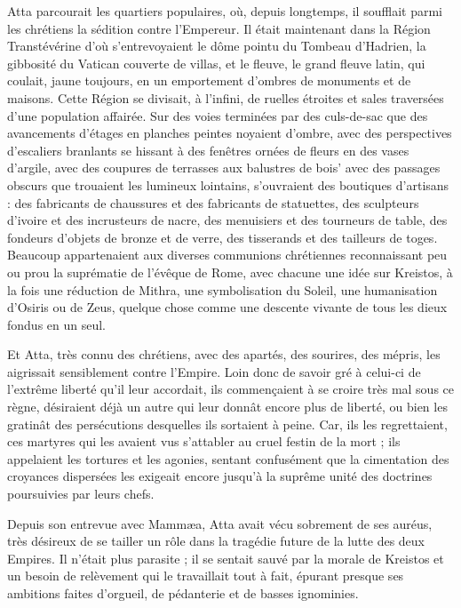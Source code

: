 \documentclass[a4paper, 11pt, oneside, polutonikogreek, french]{article}
\begin{document}
Atta parcourait les quartiers populaires, où, depuis longtemps, il soufflait parmi les chrétiens la sédition contre l'Empereur. Il était maintenant dans la Région Transtévérine d'où s'entrevoyaient le dôme pointu du Tombeau d'Hadrien, la gibbosité du Vatican couverte de villas, et le fleuve, le grand fleuve latin, qui coulait, jaune toujours, en un emportement d'ombres de monuments et de maisons. Cette Région se divisait, à l'infini, de ruelles étroites et sales traversées d'une population affairée. Sur des voies terminées par des culs-de-sac que des avancements d'étages en planches peintes noyaient d'ombre, avec des perspectives d'escaliers branlants se hissant à des fenêtres ornées de fleurs en des vases d'argile, avec des coupures de terrasses aux balustres de bois' avec des passages obscurs que trouaient les lumineux lointains, s'ouvraient des boutiques d'artisans : des fabricants de chaussures et des fabricants de statuettes, des sculpteurs d'ivoire et des incrusteurs de nacre, des menuisiers et des tourneurs de table, des fondeurs d'objets de bronze et de verre, des tisserands et des tailleurs de toges. Beaucoup appartenaient aux diverses communions chrétiennes reconnaissant peu ou prou la suprématie de l'évêque de Rome, avec chacune une idée sur Kreistos, à la fois une réduction de Mithra, une symbolisation du Soleil, une humanisation d'Osiris ou de Zeus, quelque chose comme une descente vivante de tous les dieux fondus en un seul.

Et Atta, très connu des chrétiens, avec des apartés, des sourires, des mépris, les aigrissait sensiblement contre l'Empire. Loin donc de savoir gré à celui-ci de l'extrême liberté qu'il leur accordait, ils commençaient à se croire très mal sous ce règne, désiraient déjà un autre qui leur donnât encore plus de liberté, ou bien les gratinât des persécutions desquelles ils sortaient à peine. Car, ils les regrettaient, ces martyres qui les avaient vus s'attabler au cruel festin de la mort ; ils appelaient les tortures et les agonies, sentant confusément que la cimentation des croyances dispersées les exigeait encore jusqu'à la suprême unité des doctrines poursuivies par leurs chefs.

Depuis son entrevue avec Mammæa, Atta avait vécu sobrement de ses auréus, très désireux de se tailler un rôle dans la tragédie future de la lutte des deux Empires. Il n'était plus parasite ; il se sentait sauvé par la morale de Kreistos et un besoin de relèvement qui le travaillait tout à fait, épurant presque ses ambitions faites d'orgueil, de pédanterie et de basses ignominies.
\end{document}
